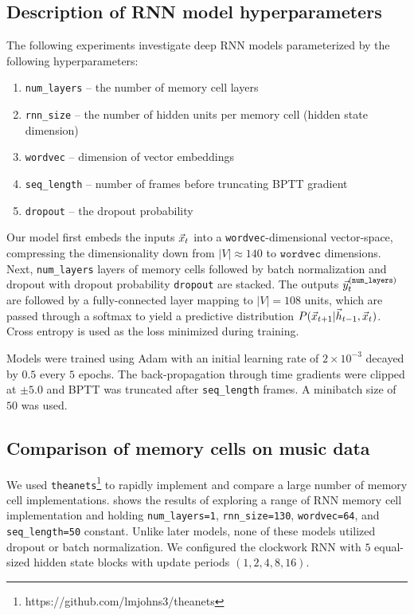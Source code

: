 \subsection{Description of RNN model hyperparameters}

The following experiments investigate deep RNN models parameterized by the
following hyperparameters:
\begin{enumerate}
  \item \texttt{num\_layers} -- the number of memory cell layers
  \item \texttt{rnn\_size} -- the number of hidden units per memory cell (\ie hidden state dimension)
  \item \texttt{wordvec} -- dimension of vector embeddings
  \item \texttt{seq\_length} -- number of frames before truncating BPTT gradient
  \item \texttt{dropout} -- the dropout probability
\end{enumerate}


Our model first embeds the inputs $\vec{x}_t$ into a \texttt{wordvec}-dimensional
vector-space, compressing the dimensionality down from $|V| \approx 140$ to
$\texttt{wordvec}$ dimensions. Next, \texttt{num\_layers} layers of memory
cells followed by batch normalization \citep{ioffe2015batch} and dropout
\citep{hinton2012improving} with dropout probability \texttt{dropout} are
stacked. The outputs $\vec{y}^{(\texttt{num\_layers})}_t$ are followed by a
fully-connected layer mapping to $|V| = 108$ units, which are passed through a
softmax to yield a predictive distribution $P(\vec{x}_{t+1} | \vec{h}_{t-1}, \vec{x}_{t})$.
Cross entropy is used as the loss minimized during training.

Models were trained using Adam \citep{kingma2014adam} with an initial learning
rate of $2 \times 10^{-3}$ decayed by $0.5$ every $5$ epochs. The
back-propagation through time gradients were clipped at $\pm5.0$
\citep{Pascanu2012} and BPTT was truncated after \texttt{seq\_length} frames. A
minibatch size of $50$ was used.

\subsection{Comparison of memory cells on music data}

We used \texttt{theanets}\footnote{https://github.com/lmjohns3/theanets} to
rapidly implement and compare a large number of memory cell implementations.
 shows the results of exploring a range of RNN
memory cell implementation and holding \texttt{num\_layers=1},
\texttt{rnn\_size=130}, \texttt{wordvec=64}, and \texttt{seq\_length=50}
constant. Unlike later models, none of these models utilized dropout or batch
normalization. We configured the clockwork RNN \citep{cho2014learning} with $5$
equal-sized hidden state blocks with update periods $(1, 2, 4, 8, 16)$.

